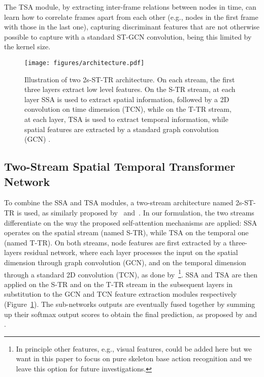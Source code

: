 \documentclass[review]{cvpr}
\begin{document}
The TSA module, by extracting inter-frame relations between nodes in time, can learn how to correlate frames apart from each other (e.g., nodes in the first frame with those in the last one), capturing discriminant features that are not otherwise possible to capture with a standard ST-GCN convolution, being this limited by the kernel size.
\begin{figure}
    \begin{center}
    \texttt{[image: figures/architecture.pdf]}
    \end{center}
    \caption{Illustration of two 2s-ST-TR architecture. On each stream, the first three layers extract low level features. On the S-TR stream, at each layer SSA is used to extract spatial information, followed by a 2D convolution on time dimension (TCN), while on the T-TR stream, at each layer, TSA is used to extract temporal information, while spatial features are extracted by a standard graph convolution (GCN) \cite{yan2018spatial}.}
    \label{architecture}
\end{figure}

\subsection{Two-Stream Spatial Temporal Transformer Network}\label{2s}

To combine the SSA and TSA modules, a two-stream architecture named 2s-ST-TR is used, as similarly proposed by~\cite{Shi2018TwoStreamAG} and~\cite{dirgraph}. In our formulation, the two streams differentiate on the way the proposed self-attention mechanisms are applied: SSA operates on the spatial stream (named S-TR), while TSA on the temporal one (named T-TR). On both streams, node features are first extracted by a three-layers residual network, where each layer processes the input on the spatial dimension through graph convolution (GCN), and on the temporal dimension through a standard 2D convolution (TCN), as done by~\cite{yan2018spatial}\footnote{In principle other features, e.g., visual features, could be added here but we want in this paper to focus on pure skeleton base action recognition and we leave this option for future investigations.}.
SSA and TSA are then applied on the S-TR and on the T-TR stream in the subsequent layers in substitution to the GCN and TCN feature extraction modules respectively (Figure~\ref{architecture}). The sub-networks outputs are eventually fused together by summing up their softmax output scores to obtain the final prediction, as proposed by \cite{Shi2018TwoStreamAG} and \cite{dirgraph}. 
\end{document}
